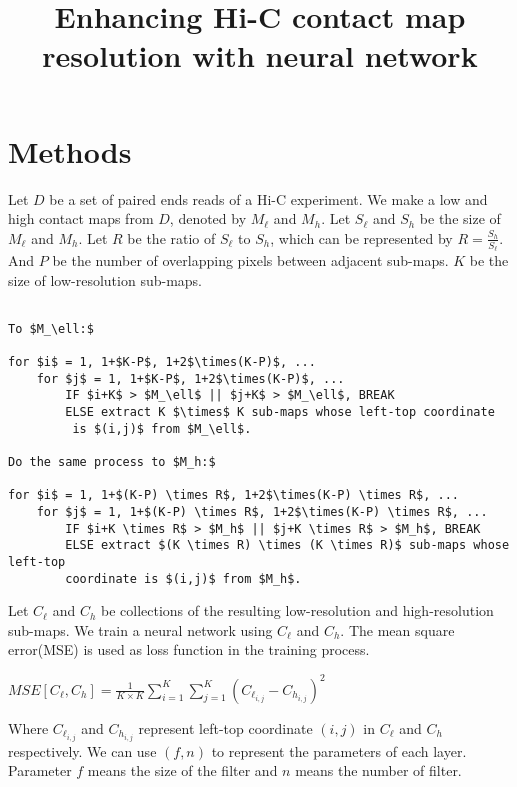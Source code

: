 \documentclass{article}
\begin{document}
\title{Enhancing Hi-C contact map resolution with neural network}
\author{}
\maketitle



\section{Methods}


Let $D$ be a set of paired ends reads of a Hi-C experiment. 
We make a low and high contact maps from $D$, denoted by $M_\ell$ and $M_h$. 
Let $S_\ell$ and $S_h$ be the size of $M_\ell$ and $M_h$. 
Let $R$ be the ratio of $S_\ell$ to $S_h$, which can be represented by
$R = \frac{S_h}{S_\ell}$. And $P$ be the number of overlapping pixels between adjacent sub-maps.
 $K$ be the size of low-resolution sub-maps.

\begin{Verbatim}[commandchars=\\\{\},codes={\catcode`$=3\catcode`_=8\catcode`^=7}]
% Divide matrices $M_\ell$ and $M_h$ \

To $M_\ell:$

for $i$ = 1, 1+$K-P$, 1+2$\times(K-P)$, ...
    for $j$ = 1, 1+$K-P$, 1+2$\times(K-P)$, ...
        IF $i+K$ > $M_\ell$ || $j+K$ > $M_\ell$, BREAK 
        ELSE extract K $\times$ K sub-maps whose left-top coordinate
         is $(i,j)$ from $M_\ell$.

Do the same process to $M_h:$

for $i$ = 1, 1+$(K-P) \times R$, 1+2$\times(K-P) \times R$, ...
    for $j$ = 1, 1+$(K-P) \times R$, 1+2$\times(K-P) \times R$, ...
        IF $i+K \times R$ > $M_h$ || $j+K \times R$ > $M_h$, BREAK 
        ELSE extract $(K \times R) \times (K \times R)$ sub-maps whose left-top 
        coordinate is $(i,j)$ from $M_h$.
\end{Verbatim}



\noindent Let $C_\ell$ and $C_h$ be collections of the resulting low-resolution and high-resolution
sub-maps. We train a neural network using $C_\ell$ and $C_h$. The mean square error(MSE) is used as 
loss function in the training process. 

\begin{center}
    $MSE[C_\ell, C_h] = \frac{1}{K \times K} \sum_{i=1}^{K} \sum_{j=1}^{K} (C_{\ell_{i,j}}-C_{h_{i,j}})^2$
\end{center}
Where $C_{\ell_{i,j}}$ and $C_{h_{i,j}}$ represent left-top coordinate $(i,j)$ in $C_\ell$ and $C_h$ respectively.
\noindent We can use $(f,n)$ to represent the parameters of each layer. Parameter $f$ means the size of the filter and $n$ means the number of filter. 
\end{document}
